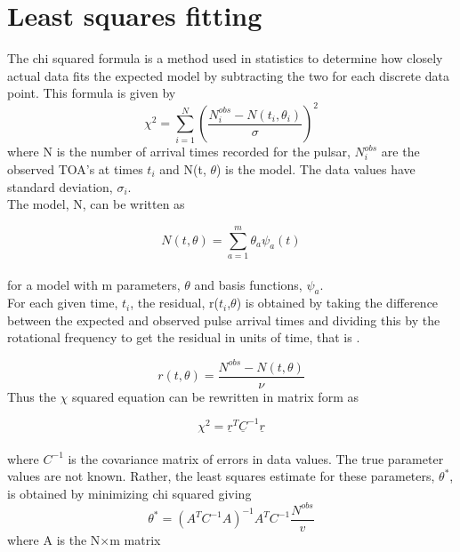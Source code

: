 \documentclass[12pt]{article}
\begin{document}
	\section{Least squares fitting}\label{Least squares fitting}
	
	The chi squared formula is a method used in statistics to determine how closely actual data fits the expected model by subtracting the two for each discrete data point. This formula is given by
	\begin{equation}\label{chi squared sum form}
	\chi^2={\sum_{i=1}^{N} (\frac{N_i^{obs}-N(t_i,\theta_i)}{\sigma})}^2
	\end{equation}
	where N is the number of arrival times recorded for the pulsar, $N_i^{obs}$ are the observed TOA's at times $t_i$ and N(t, $\theta$) is the model. The data values have standard deviation, $\sigma_i$.\\
	The model, N, can be written as 
	
	\begin{equation}\label{model N}
	N(t,\theta)={\sum_{a=1}^{m}\theta_a \psi_a (t)}
	\end{equation}\\
	for a model with m parameters, $\theta$ and basis functions, $\psi_a$.\\
	For each given time, $t_i$, the residual, r($t_i$,$\theta$) is obtained by taking the difference between the expected and observed pulse arrival times and dividing this by the rotational frequency to get the residual in units of time, that is \cite{kopeikin1999millisecond}.
	
	\begin{equation}\label{residual r relating to model N}
	r(t,\theta)=\frac{N^{obs}-N(t,\theta)}{\nu}
	\end{equation}
	Thus the $\chi$ squared equation can be rewritten in matrix form as
	
	\begin{equation}\label{chi squared matrix form}
	\chi^2=\underline{r}^{T}\underline{C}^{-1}\underline{r}
	\end{equation}\\
	where $C^{-1}$ is the covariance matrix of errors in data values. 
	The true parameter values are not known. Rather, the least squares estimate for these parameters, $\theta^*$, is obtained by minimizing chi squared giving 
	\begin{equation}\label{theta parameter equation}
	\theta^*=(A^{T}C^{-1}A)^{-1}A^{T}C^{-1}\frac{N^{obs}}{v}
	\end{equation}
	where A is the N$\times$m matrix 
	
\end{document}
